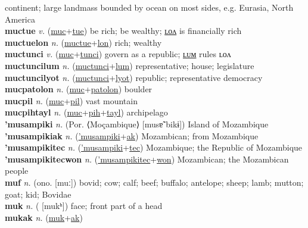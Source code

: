 continent; large landmass bounded by ocean on most sides, e.g. Eurasia, North America \label{muctayl} \\
\textbf{muctue} \textit{v.} (\hyperref[muc]{muc}+\hyperref[tue]{tue})
be rich; be wealthy; \hyperref[muctuelon]{ʟᴏᴧ} is financially rich \label{muctue} \\
\textbf{muctuelon} \textit{n.} (\hyperref[muctue]{muctue}+\hyperref[lon]{lon})
rich; wealthy \label{muctuelon} \\
\textbf{muctunci} \textit{v.} (\hyperref[muc]{muc}+\hyperref[tunci]{tunci})
govern as a republic; \hyperref[muctuncilum]{ʟᴜᴍ} rules ʟᴏᴧ \label{muctunci} \\
\textbf{muctuncilum} \textit{n.} (\hyperref[muctunci]{muctunci}+\hyperref[lum]{lum})
representative; house; legislature \label{muctuncilum} \\
\textbf{muctuncilyot} \textit{n.} (\hyperref[muctunci]{muctunci}+\hyperref[lyot]{lyot})
republic; representative democracy \label{muctuncilyot} \\
\textbf{mucpatolon} \textit{n.} (\hyperref[muc]{muc}+\hyperref[patolon]{patolon})
boulder \label{mucpatolon} \\
\textbf{mucpil} \textit{n.} (\hyperref[muc]{muc}+\hyperref[pil]{pil})
vast mountain \label{mucpil} \\
\textbf{mucpihtayl} \textit{n.} (\hyperref[muc]{muc}+\hyperref[pih]{pih}+\hyperref[tayl]{tayl})
archipelago \label{mucpihtayl} \\
\textbf{'musampiki} \textit{n.} (Por. ⟨Moçambique⟩ [musɐ̃ˈbikɨ])
Island of Mozambique \label{'musampiki} \\
\textbf{'musampikiak} \textit{n.} (\hyperref['musampiki]{'musampiki}+\hyperref[ak]{ak})
Mozambican; from Mozambique \label{'musampikiak} \\
\textbf{'musampikitec} \textit{n.} (\hyperref['musampiki]{'musampiki}+\hyperref[tec]{tec})
Mozambique; the Republic of Mozambique \label{'musampikitec} \\
\textbf{'musampikitecwon} \textit{n.} (\hyperref['musampikitec]{'musampikitec}+\hyperref[won]{won})
Mozambican; the Mozambican people \label{'musampikitecwon} \\
\textbf{muf} \textit{n.} (ono. [muː])
bovid; cow; calf; beef; buffalo; antelope; sheep; lamb; mutton; goat; kid; Bovidae \label{muf} \\
\textbf{muk} \textit{n.} ( [mukʰ])
face; front part of a head \label{muk} \\
\textbf{mukak} \textit{n.} (\hyperref[muk]{muk}+\hyperref[ak]{ak})
